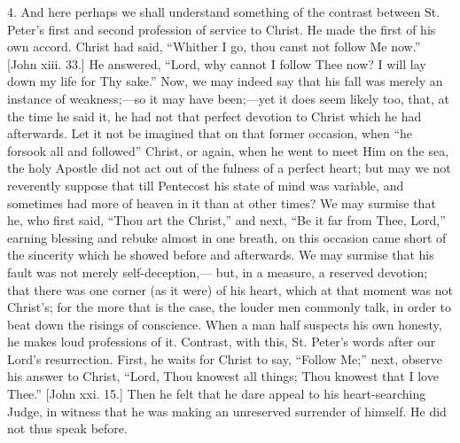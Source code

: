 4. And here perhaps we shall understand something of the contrast
between St. Peter's first and second profession of service to Christ.
He made the first of his own accord. Christ had said, ``Whither I
go, thou canst not follow Me now.'' [John xiii. 33.] He answered,
``Lord, why cannot I follow Thee now? I will lay down my life for
Thy sake.'' Now, we may indeed say that his fall was merely an
instance of weakness;—so it may have been;—yet it does seem likely
too, that, at the time he said it, he had not that perfect devotion to
Christ which he had afterwards. Let it not be imagined that on that
former occasion, when ``he forsook all and followed'' Christ,
or again, when he went to meet Him on the sea, the holy Apostle did
not act out of the fulness of a perfect heart; but may we not
reverently suppose that till Pentecost his state of mind was variable,
and sometimes had more of heaven in it than at other times? We may
surmise that he, who first said, ``Thou art the Christ,'' and
next, ``Be it far from Thee, Lord,'' earning blessing and
rebuke almost in one breath, on this occasion came short of the
sincerity which he showed before and afterwards. We may surmise that
his fault was not merely self-deception,— but, in a measure, a
reserved devotion; that there was one corner (as it were) of his
heart, which at that moment was not Christ's; for the more that is the
case, the louder men commonly talk, in order to beat down the risings
of conscience. When a man half suspects his own honesty, he makes loud
professions of it. Contrast, with this, St. Peter's words after our
Lord's resurrection. First, he waits for Christ to say, ``Follow
Me;'' next, observe his answer to Christ, ``Lord, Thou knowest
all things; Thou knowest that I love Thee.'' [John xxi. 15.] Then
he felt that he dare appeal to his heart-searching Judge, in witness
that he was making an unreserved surrender of himself. He did not thus
speak before.

